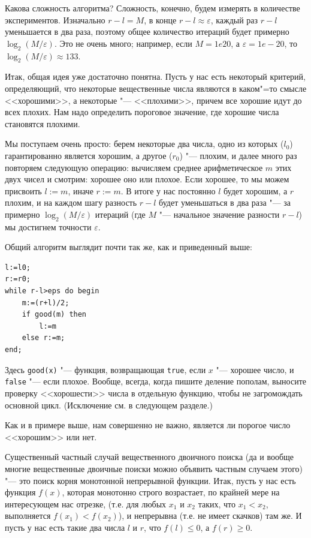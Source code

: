 \documentclass[a4paper,10pt]{problems}
\let\eps\varepsilon
\begin{document}
Какова сложность алгоритма? Сложность, конечно, будем измерять в количестве экспериментов.
Изначально $r-l=M$, в конце $r-l\approx \eps$, каждый раз $r-l$ уменьшается в два раза,
поэтому общее количество итераций будет примерно $\log_2 (M/\eps)$. 
Это не очень много; например, если $M=1e20$, а $\eps=1e-20$, то $\log_2 (M/\eps)\approx 133$.

Итак, общая идея уже достаточно понятна. 
Пусть у нас есть некоторый критерий, определяющий, что некоторые вещественные числа являются в каком"=то смысле <<хорошими>>, а некоторые "--- <<плохими>>,
причем все хорошие идут до всех плохих. 
Нам надо определить пороговое значение, где хорошие числа становятся плохими.

Мы поступаем очень просто: берем некоторые два числа, одно из которых ($l_0$) гарантированно является хорошим, а другое ($r_0$) "--- плохим,
и далее много раз повторяем следующую операцию: вычисляем среднее арифметическое $m$ этих двух чисел и смотрим: хорошее оно или плохое.
Если хорошее, то мы можем присвоить $l:=m$, иначе $r:=m$. 
В итоге у нас постоянно $l$ будет хорошим, а $r$ плохим, и на каждом шагу разность $r-l$ будет уменьшаться в два раза 
"--- за примерно $\log_2(M/\eps)$ итераций (где $M$ "--- начальное значение разности $r-l$) мы достигнем точности $\eps$.

Общий алгоритм выглядит почти так же, как и приведенный выше:
\begin{codesampleo}\begin{verbatim}
l:=l0;
r:=r0;
while r-l>eps do begin    
    m:=(r+l)/2;
    if good(m) then
        l:=m
    else r:=m;
end;
\end{verbatim}
\end{codesampleo}

Здесь \verb`good(x)` "--- функция, возвращающая \verb`true`, если $x$ "--- хорошее число, и \verb`false` "--- если плохое. 
Вообще, всегда, когда пишите деление пополам, выносите проверку <<хорошести>> числа в отдельную функцию, чтобы не загромождать основной цикл.
(Исключение см. в следующем разделе.)

Как и в примере выше, нам совершенно не важно, является ли порогое число <<хорошим>> или нет.

Существенный частный случай вещественного двоичного поиска (да и вообще многие вещественные двоичные поиски можно объявить частным случаем этого)
"--- это поиск корня монотонной непрерывной функции.
Итак, пусть у нас есть функция $f(x)$, которая монотонно строго возрастает, по крайней мере на интересующем нас отрезке, (т.е. для любых $x_1$ и $x_2$ таких, что $x_1<x_2$, выполняется $f(x_1)<f(x_2)$),
и непрерывна (т.е. не имеет скачков) там же.
И пусть у нас есть такие два числа $l$ и $r$, что $f(l)\leq0$, а $f(r)\geq0$.
\end{document}
